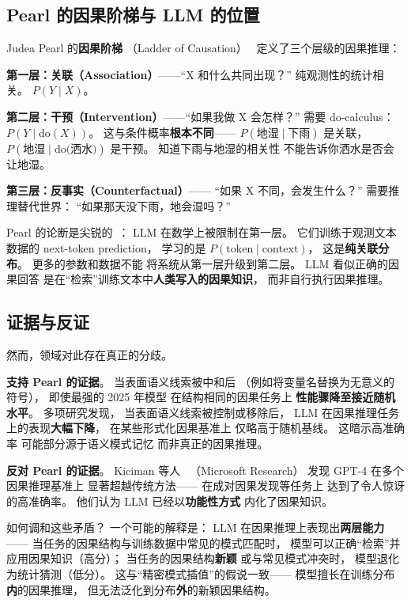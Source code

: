\subsection{Pearl 的因果阶梯与 LLM 的位置}

Judea Pearl 的\textbf{因果阶梯}
（Ladder of Causation）~\cite{pearl2009causality}
定义了三个层级的因果推理：

\textbf{第一层：关联（Association）}——``X 和什么共同出现？''
纯观测性的统计相关。
$P(Y \mid X)$。

\textbf{第二层：干预（Intervention）}——``如果我做 X 会怎样？''
需要 do-calculus：$P(Y \mid \text{do}(X))$。
这与条件概率\textbf{根本不同}——
$P(\text{地湿} \mid \text{下雨})$ 是关联，
$P(\text{地湿} \mid \text{do(洒水)})$ 是干预。
知道下雨与地湿的相关性
不能告诉你洒水是否会让地湿。

\textbf{第三层：反事实（Counterfactual）}——
``如果 X 不同，会发生什么？''
需要推理替代世界：
``如果那天没下雨，地会湿吗？''

Pearl 的论断是尖锐的~\cite{pearl2025aaas}：
LLM 在数学上被限制在第一层。
它们训练于观测文本数据的 next-token prediction，
学习的是 $P(\text{token} \mid \text{context})$，
这是\textbf{纯关联分布}。
更多的参数和数据不能
将系统从第一层升级到第二层。
LLM 看似正确的因果回答
是在``检索''训练文本中\textbf{人类写入的因果知识}，
而非自行执行因果推理。

\subsection{证据与反证}

然而，领域对此存在真正的分歧。

\textbf{支持 Pearl 的证据}。
当表面语义线索被中和后
（例如将变量名替换为无意义的符号），
即使最强的 2025 年模型
在结构相同的因果任务上
\textbf{性能骤降至接近随机水平}。
多项研究发现，
当表面语义线索被控制或移除后，
LLM 在因果推理任务上的表现\textbf{大幅下降}，
在某些形式化因果基准上
仅略高于随机基线。
这暗示高准确率
可能部分源于语义模式记忆
而非真正的因果推理。

\textbf{反对 Pearl 的证据}。
Kiciman 等人~\cite{kiciman2024causal}
（Microsoft Research）
发现 GPT-4 在多个因果推理基准上
显著超越传统方法——
在成对因果发现等任务上
达到了令人惊讶的高准确率。
他们认为 LLM 已经以\textbf{功能性方式}
内化了因果知识。

如何调和这些矛盾？
一个可能的解释是：
LLM 在因果推理上表现出\textbf{两层能力}——
当任务的因果结构与训练数据中常见的模式匹配时，
模型可以正确``检索''并应用因果知识（高分）；
当任务的因果结构\textbf{新颖}
或与常见模式冲突时，
模型退化为统计猜测（低分）。
这与``精密模式插值''的假说一致——
模型擅长在训练分布\textbf{内}的因果推理，
但无法泛化到分布\textbf{外}的新颖因果结构。

